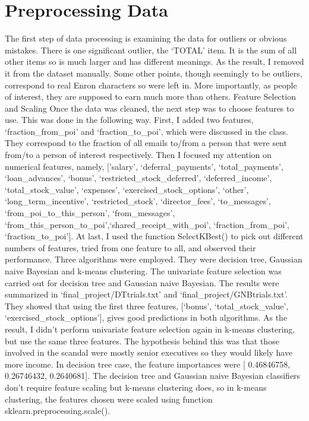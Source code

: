 \documentclass[12pt]{article}
\begin{document}
\section{Preprocessing Data}
The first step of data processing is examining the data for outliers or obvious mistakes.  There is one significant outlier, the `TOTAL' item. It is the sum of all other items so is much larger and has different meanings. As the result, I removed it from the dataset manually. Some other points, though seemingly to be outliers, correspond to real Enron characters so were left in.  More importantly, as people of interest, they are supposed to earn much more than others.
Feature Selection and Scaling
Once the data was cleaned, the next step was to choose features to use.  This was done in the following way. First, I added two features, `fraction\_from\_poi' and `fraction\_to\_poi', which were discussed in the class. They correspond to the fraction of all emails to/from a person that were sent from/to a person of interest respectively. Then I focused my attention on numerical features, namely,
['salary', `deferral\_payments', `total\_payments', `loan\_advances', `bonus', `restricted\_stock\_deferred', `deferred\_income',
`total\_stock\_value', `expenses', `exercised\_stock\_options', `other', `long\_term\_incentive', `restricted\_stock', `director\_fees', `to\_messages', `from\_poi\_to\_this\_person', `from\_messages', `from\_this\_person\_to\_poi',`shared\_receipt\_with\_poi',
`fraction\_from\_poi', `fraction\_to\_poi'].
At last, I used the function SelectKBest() to pick out different numbers of features, tried from one feature to all, and observed their performance. Three algorithms were employed. They were decision tree, Gaussian naive Bayesian and k-means clustering. The univariate feature selection was carried out for decision tree and Gaussian naive Bayesian. The results were summarized in `final\_project/DTtrials.txt' and `final\_project/GNBtrials.txt'. They showed that using the first three features, [`bonus', `total\_stock\_value', `exercised\_stock\_options'], gives good predictions in both algorithms. As the result, I didn't perform univariate feature selection again in k-means clustering, but use the same three features. The hypothesis behind this was that those involved in the scandal were mostly senior executives so they would likely have more income. In decision tree case, the feature importances were [ 0.46846758,  0.26746432,  0.2640681].
The decision tree and Gaussian naive Bayesian classifiers don't require feature scaling but k-means clustering does, so in k-means clustering, the features chosen were scaled using function sklearn.preprocessing.scale().
\end{document}
